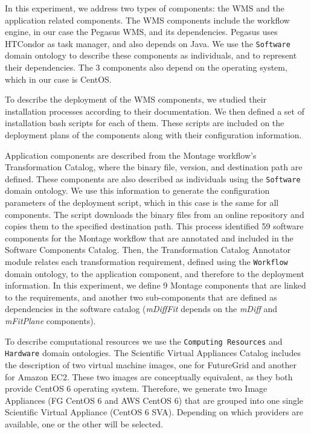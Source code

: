 \documentclass[final,5p,times,twocolumn]{elsarticle}
\begin{document}
In this experiment, we address two types of components: the WMS and the application related components. The WMS components include the workflow engine, in our case the Pegasus WMS, and its dependencies. Pegasus uses HTCondor as task manager, and also depends on Java. We use the \texttt{Software} domain ontology to describe these components as individuals, and to represent their dependencies. The 3 components also depend on the operating system, which in our case is CentOS.

To describe the deployment of the WMS components, we studied their installation processes according to their documentation. We then defined a set of installation bash scripts for each of them. These scripts are included on the deployment plans of the components along with their configuration information.  
 
Application components are described from the Montage workflow's Transformation Catalog, where the binary file, version, and destination path are defined. These components are also described as individuals using the \texttt{Software} domain ontology. We use this information to generate the configuration parameters of the deployment script, which in this case is the same for all components. The script downloads the binary files from an online repository and copies them to the specified destination path. This process identified 59 software components for the Montage workflow that are annotated and included in the Software Components Catalog.
Then, the Transformation Catalog Annotator module relates each transformation requirement, defined using the \texttt{Workflow} domain ontology, to the application component, and therefore to the deployment information.
In this experiment, we define 9 Montage components that are linked to the requirements, and another two sub-components that are defined as dependencies in the software catalog (\emph{mDiffFit} depends on the \emph{mDiff} and \emph{mFitPlane} components).

To describe computational resources we use the \texttt{Computing Resources} and \texttt{Hardware} domain ontologies. The Scientific Virtual Appliances Catalog includes the description of two virtual machine images, one for FutureGrid and another for Amazon EC2. These two images are conceptually equivalent, as they both provide CentOS 6 operating system.
Therefore, we generate two Image Appliances (FG CentOS 6 and AWS CentOS 6) that are grouped into one single Scientific Virtual Appliance (CentOS 6 SVA). Depending on which providers are available, one or the other will be selected.
\end{document}
